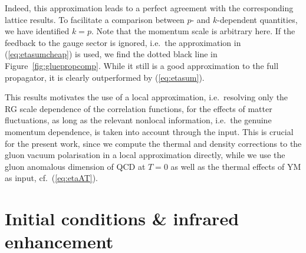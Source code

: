 \documentclass[%
reprint,
superscriptaddress,
showpacs,preprintnumbers,
 amsmath,amssymb,
 aps,
prd,
]{revtex4-1}
\def\Fig#1{Figure~\ref{#1}}
\def\eq#1{(\ref{#1})}
\begin{document}
Indeed, this approximation leads to a perfect agreement with the
corresponding lattice results. To facilitate a comparison between $p$-
and $k$-dependent quantities, we have identified $k=p$. Note that the
momentum scale is arbitrary here. If the feedback to the gauge sector
is ignored, i.e.\ the approximation in \eq{eq:etasumcheap} is used, we
find the dotted black line in \Fig{fig:gluepropcomp}. While it still
is a good approximation to the full propagator, it is clearly
outperformed by \eq{eq:etasum}.

This results motivates the use of a local approximation, i.e.\
resolving only the RG scale dependence of the correlation functions,
for the effects of matter fluctuations, as long as the relevant
nonlocal information, i.e.\ the genuine momentum dependence, is taken
into account through the input. This is crucial for the present work,
since we compute the thermal and density corrections to the gluon
vacuum polarisation in a local approximation directly, while we use
the gluon anomalous dimension of QCD at $T = 0$ as well as the thermal
effects of YM as input, cf.\ \eq{eq:etaAT}.





\section{Initial conditions \& infrared enhancement}
\label{app:num}
\end{document}
